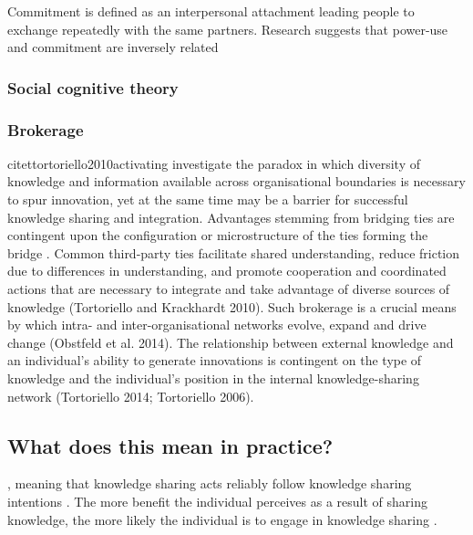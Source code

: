 Commitment is defined as an interpersonal attachment leading people to exchange repeatedly with the same partners. Research suggests that power-use and commitment are inversely related \citep{cook1978power}


\subsubsection{Social cognitive theory}

\subsubsection{Brokerage}


citet{tortoriello2010activating} investigate the paradox in which diversity of knowledge and information available across organisational boundaries is necessary to spur innovation, yet at the same time may be a barrier for successful knowledge sharing and integration. Advantages stemming from bridging ties are contingent upon the configuration or microstructure of the ties forming the bridge \citep{tortoriello2010activating,tortoriello2015social}. Common third-party ties facilitate shared understanding, reduce friction due to differences in understanding, and promote cooperation and coordinated actions that are necessary to integrate and take advantage of diverse sources of knowledge (Tortoriello and Krackhardt 2010). Such brokerage is a crucial means by which intra- and inter-organisational networks evolve, expand and drive change (Obstfeld et al. 2014). The relationship between external knowledge and an individual’s ability to generate innovations is contingent on the type of knowledge and the individual’s position in the internal knowledge-sharing network (Tortoriello 2014; Tortoriello 2006). 


\subsection{What does this mean in practice?}

, meaning that knowledge sharing acts reliably follow knowledge sharing intentions \citep{witherspoon2013antecedents}. The more benefit the individual perceives as a result of sharing knowledge, the more likely the individual is to engage in knowledge sharing \citep{bock2001breaking,witherspoon2013antecedents}.

